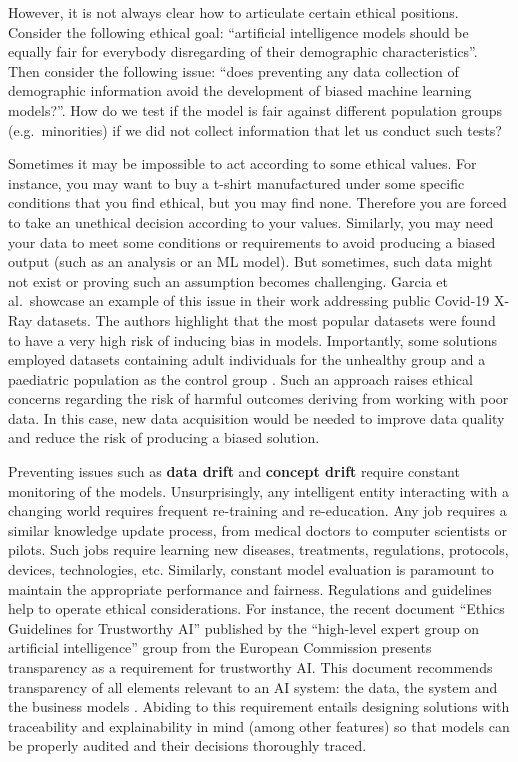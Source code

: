 \documentclass[
]{book}
\begin{document}
However, it is not always clear how to articulate certain ethical positions. Consider the following ethical goal: ``artificial intelligence models should be equally fair for everybody disregarding of their demographic characteristics''. Then consider the following issue: ``does preventing any data collection of demographic information avoid the development of biased machine learning models?''. How do we test if the model is fair against different population groups (e.g.~minorities) if we did not collect information that let us conduct such tests?

Sometimes it may be impossible to act according to some ethical values. For instance, you may want to buy a t-shirt manufactured under some specific conditions that you find ethical, but you may find none. Therefore you are forced to take an unethical decision according to your values. Similarly, you may need your data to meet some conditions or requirements to avoid producing a biased output (such as an analysis or an ML model). But sometimes, such data might not exist or proving such an assumption becomes challenging. Garcia et al.~showcase an example of this issue in their work addressing public Covid-19 X-Ray datasets. The authors highlight that the most popular datasets were found to have a very high risk of inducing bias in models. Importantly, some solutions employed datasets containing adult individuals for the unhealthy group and a paediatric population as the control group \citep{santa2021public}. Such an approach raises ethical concerns regarding the risk of harmful outcomes deriving from working with poor data. In this case, new data acquisition would be needed to improve data quality and reduce the risk of producing a biased solution.

Preventing issues such as \textbf{data drift} and \textbf{concept drift} require constant monitoring of the models. Unsurprisingly, any intelligent entity interacting with a changing world requires frequent re-training and re-education. Any job requires a similar knowledge update process, from medical doctors to computer scientists or pilots. Such jobs require learning new diseases, treatments, regulations, protocols, devices, technologies, etc. Similarly, constant model evaluation is paramount to maintain the appropriate performance and fairness. Regulations and guidelines help to operate ethical considerations. For instance, the recent document ``Ethics Guidelines for Trustworthy AI'' published by the ``high-level expert group on artificial intelligence'' group from the European Commission presents transparency as a requirement for trustworthy AI. This document recommends transparency of all elements relevant to an AI system: the data, the system and the business models \citep{ai2019high}. Abiding to this requirement entails designing solutions with traceability and explainability in mind (among other features) so that models can be properly audited and their decisions thoroughly traced.
\end{document}
